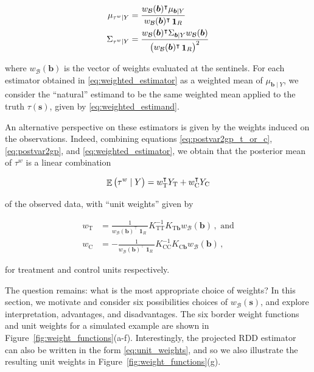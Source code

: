 \documentclass[letter]{article}
\DeclareMathOperator{\E}{\mathbb{E}}
\DeclareMathOperator{\ones}{\mathbf{1}}
\newcommand{\trans}{^{\intercal}}
\newcommand{\treat}{\mathrm{T}}
\newcommand{\ctrol}{\mathrm{C}}
\newcommand{\svec}{\mathbold{s}}
\newcommand{\boundary}{\mathcal{B}}
\newcommand{\sentinels}{\bm{b}}
\newcommand{\tauw}{\tau^{w}}
\newcommand{\eqlabel}[1]{\label{#1}}
\newcommand{\numsent}{R}
\newcommand{\weightb}{w_{\boundary}}
\newcommand{\wt}{w_{\treat}}
\newcommand{\wc}{w_{\ctrol}}
\begin{document}
\begin{equation}\begin{split}
    \mu_{\tauw \mid Y} &= \frac{\weightb(\sentinels)\trans \mu_{\sentinels \mid Y}}
                               {\weightb(\sentinels)\trans  \ones_\numsent} \\
    \Sigma_{\tauw \mid Y} &= \frac{\weightb(\sentinels)\trans \Sigma_{\sentinels \mid Y} \weightb(\sentinels)}
                                  { \del{\weightb(\sentinels)\trans  \ones_\numsent }^2 }\\
\end{split}
\eqlabel{eq:weighted_estimator}
\end{equation}

where \(\weightb(\sentinels)\) is the vector of weights evaluated at the sentinels.
For each estimator obtained in \eqref{eq:weighted_estimator} as a weighted mean of \(\mu_{\sentinels \mid Y}\), we consider the ``natural'' estimand to be the same weighted mean applied to the truth \(\tau(\svec)\), given by \eqref{eq:weighted_estimand}.

An alternative perspective on these estimators is given by the weights induced on the observations.
Indeed, combining equations \eqref{eq:postvar2gp_t_or_c}, \eqref{eq:postvar2gp}, and \eqref{eq:weighted_estimator}, we obtain that the posterior mean of \(\tauw\) is a linear combination

\begin{equation}
\E\del{\tauw \mid Y} = \wt\trans Y_\treat + \wc\trans Y_\ctrol
\eqlabel{eq:unit_weights}
\end{equation}

of the observed data, with ``unit weights'' given by

\begin{equation}
\begin{split}
\wt &= \frac{1}{\weightb(\sentinels)\trans \ones_{\numsent}}
K_{\treat \treat}^{-1} K_{\treat \sentinels} \weightb(\sentinels) \,, \text{ and}
\\
\wc &= -\frac{1}{\weightb(\sentinels)\trans \ones_{\numsent}} 
K_{\ctrol \ctrol}^{-1} K_{\ctrol \sentinels} \weightb(\sentinels) \,,
\end{split}
\end{equation}

for treatment and control units respectively.

The question remains: what is the most appropriate choice of weights? In this section, we motivate and consider six possibilities choices of \(\weightb(\svec)\), and explore interpretation, advantages, and disadvantages.
The six border weight functions and unit weights for a simulated example are shown in Figure~\ref{fig:weight_functions}(a-f).
Interestingly, the projected RDD estimator can also be written in the form \eqref{eq:unit_weights}, and so we also illustrate the resulting unit weights in Figure~\ref{fig:weight_functions}(g).
    
\end{document}
